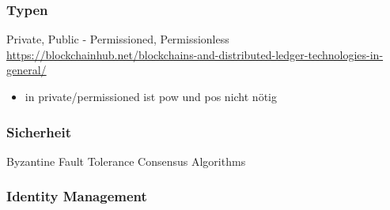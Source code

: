     
    \begin{figure}[H]
    \end{figure}
    
    \subsubsection{Typen}
        Private, Public - Permissioned, Permissionless
        \sloppy\url{https://blockchainhub.net/blockchains-and-distributed-ledger-technologies-in-general/}
        \begin{itemize}[noitemsep]
            \item in private/\-permissioned ist \gls{pow} und \gls{pos} nicht nötig
        \end{itemize}
    
    \subsubsection{Sicherheit}
    \label{sec:sota_blockchain_security}
        Byzantine Fault Tolerance
        Consensus Algorithms
    
    \subsubsection{Identity Management}
    \label{sec:sota_blockchain_identitymgmnt}
